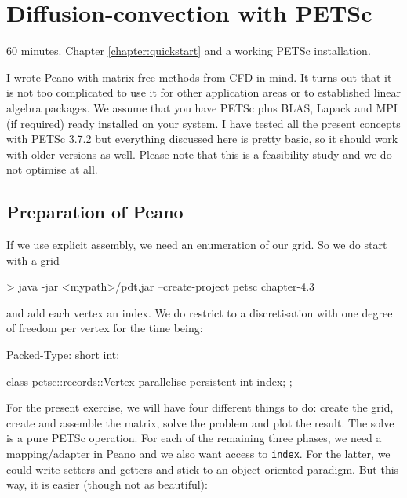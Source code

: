 \section{Diffusion-convection with PETSc}
  \label{section:applications:petsc}

\chapterDescription
  {
    60 minutes.
  }
  {
    Chapter \ref{chapter:quickstart} and a working PETSc installation.
  }

I wrote Peano with matrix-free methods from CFD in mind. 
It turns out that it is not too complicated to use it for other application
areas or to established linear algebra packages.
We assume that you have PETSc plus BLAS, Lapack and MPI (if required) ready
installed on your system.
I have tested all the present concepts with PETSc 3.7.2 but everything discussed
here is pretty basic, so it should work with older versions as well.
Please note that this is a feasibility study and we do not optimise at all.


\subsection{Preparation of Peano}

If we use explicit assembly, we need an enumeration of our grid. 
So we do start with a grid
\begin{code}
> java -jar <mypath>/pdt.jar --create-project petsc chapter-4.3
\end{code}

\noindent
and add each vertex an index. 
We do restrict to a discretisation with one degree of freedom per vertex for the
time being:

\begin{code}
Packed-Type: short int;

class petsc::records::Vertex {  
  parallelise persistent int index;
};
\end{code}

\noindent
For the present exercise, we will have four different things to do:
create the grid, create and assemble the matrix, solve the problem and plot the
result.
The solve is a pure PETSc operation.
For each of the remaining three phases, we need a mapping/adapter in Peano and
we also want access to \texttt{index}.
For the latter, we could write setters and getters and stick to an
object-oriented paradigm.
But this way, it is easier (though not as beautiful):

